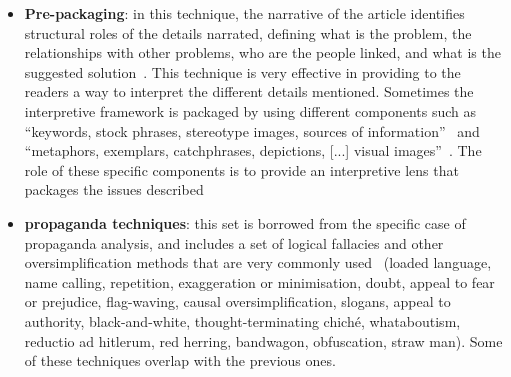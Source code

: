 \begin{itemize}
    
    \item \textbf{Pre-packaging}: in this technique, the narrative of the article identifies structural roles of the details narrated, defining what is the problem, the relationships with other problems, who are the people linked, and what is the suggested solution~\cite{entman1993framing,bell1991language}.
    This technique is very effective in providing to the readers a way to interpret the different details mentioned.
    Sometimes the interpretive framework is packaged by using different components such as ``keywords, stock phrases, stereotype images, sources of information''~\cite{entman1993framing} and ``metaphors, exemplars, catchphrases, depictions, [...] visual images''~\cite{gamson1989media}.
    The role of these specific components is to provide an interpretive lens that packages the issues described
    
    \item \textbf{propaganda techniques}: this set is borrowed from the specific case of propaganda analysis, and includes a set of logical fallacies and other oversimplification methods that are very commonly used~\cite{da2019fine} (loaded language, name calling, repetition, exaggeration or minimisation, doubt, appeal to fear or prejudice, flag-waving, causal oversimplification, slogans, appeal to authority, black-and-white, thought-terminating chiché, whataboutism, reductio ad hitlerum, red herring, bandwagon, obfuscation, straw man).
    Some of these techniques overlap with the previous ones.
\end{itemize}



